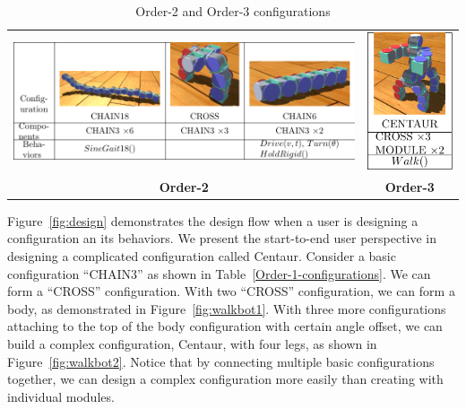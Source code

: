 \documentclass[graybox]{svmult}
\begin{document}
\begin{table}
    \begin{center}
        \begin{tabular}{c c}
        \includegraphics[scale=0.9]{images/library/tier2.pdf} &
        \includegraphics[scale=1]{images/library/tier3.pdf} \\
        \textbf{Order-2} & \textbf{Order-3}
        \end{tabular}
        \caption{Order-2 and Order-3 configurations}
        \label{Order-2-configurations}
    \end{center}
\end{table}

Figure~\ref{fig:design} demonstrates the design flow when a user is designing a configuration an its behaviors. We present the start-to-end user perspective in designing a complicated configuration called Centaur. Consider a basic configuration ``CHAIN3'' as shown in Table~\ref{Order-1-configurations}. We can form a ``CROSS'' configuration. With two ``CROSS'' configuration, we can form a body, as demonstrated in Figure~\ref{fig:walkbot1}. With three more configurations attaching to the top of the body configuration with certain angle offset, we can build a complex configuration, Centaur, with four legs, as shown in Figure~\ref{fig:walkbot2}. Notice that by connecting multiple  basic configurations together, we can design a complex configuration more easily than creating with individual modules.
\end{document}

